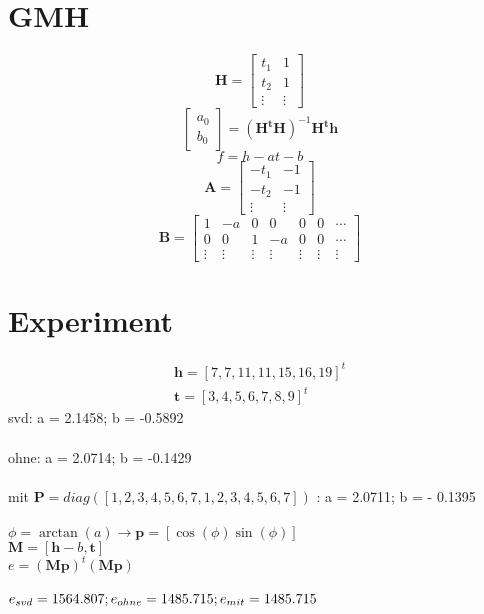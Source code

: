 \documentclass[12pt]{article}
\begin{document}
\section{GMH}
\begin{equation}
	\bm{H} = \begin{bmatrix}
		t_1 & 1\\
		t_2 & 1\\
		\vdots & \vdots
	\end{bmatrix}
\end{equation}
\begin{equation}
	\begin{bmatrix}
		a_0\\b_0
	\end{bmatrix} = (\bm{H^tH})^{-1}\bm{H^t}\bm{h}
\end{equation}
\begin{equation}
	f = h - at - b
\end{equation}
\begin{equation}
	\bm{A} = \begin{bmatrix}
		-t_1 & -1\\
		-t_2 & -1\\
		\vdots & \vdots
	\end{bmatrix}
\end{equation}
\begin{equation}
	\bm{B} = \begin{bmatrix}
		1 & -a & 0 & 0 & 0 & 0 & \cdots \\
		0 & 0 & 1 & -a & 0 & 0 & \cdots \\
		\vdots & \vdots & \vdots & \vdots& \vdots& \vdots& \vdots
	\end{bmatrix}
\end{equation}

\section{Experiment}
\begin{gather}
	\bm{h} = [7,7,11,11,15,16,19]^t\\
	\bm{t} = [3,4,5,6,7,8,9]^t
\end{gather}
svd: a = 2.1458; b = -0.5892 \\\\
ohne: a = 2.0714; b = -0.1429 \\\\
mit $\bm{P} = diag([1,2,3,4,5,6,7,1,2,3,4,5,6,7])$ : a = 2.0711; b = - 0.1395 
\\\\
$\phi = \arctan(a) \rightarrow \bm{p} = [\cos(\phi) \sin(\phi)]$
\\$\bm{M} = [\bm{h}-b, \bm{t}]$
\\$e = (\bm{Mp})^t(\bm{Mp})$
\\\\
$e_{svd} = 1564.807;\\
e_{ohne} = 1485.715;\\
e_{mit} = 1485.715$
\end{document}
